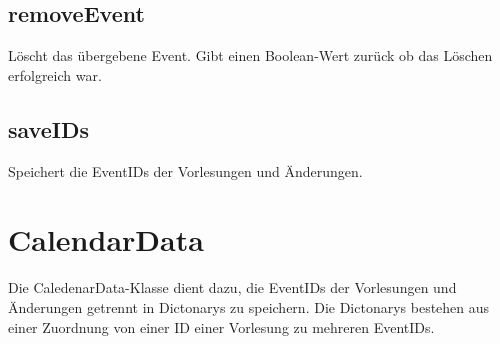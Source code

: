 \subsection{removeEvent}
Löscht das übergebene Event. Gibt einen Boolean-Wert zurück ob das Löschen erfolgreich war.

\subsection{saveIDs}
Speichert die EventIDs der Vorlesungen und Änderungen.

\newpage
\section{CalendarData}
Die CaledenarData-Klasse dient dazu, die EventIDs der Vorlesungen und Änderungen getrennt in Dictonarys zu speichern.
Die Dictonarys bestehen aus einer Zuordnung von einer ID einer Vorlesung zu mehreren EventIDs.

